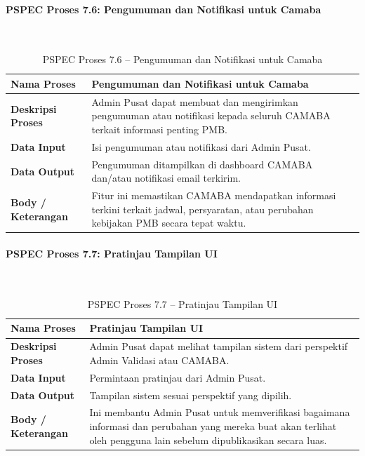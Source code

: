 \paragraph{PSPEC Proses 7.6: Pengumuman dan Notifikasi untuk Camaba}~\\
\begin{longtable}{|p{}|p{}|}
	\caption{PSPEC Proses 7.6 -- Pengumuman dan Notifikasi untuk Camaba}
	\label{table:3.pspec76}\\
	\hline
	\textbf{Nama Proses} & Pengumuman dan Notifikasi untuk Camaba \\
	\hline
	\textbf{Deskripsi Proses} & Admin Pusat dapat membuat dan mengirimkan pengumuman atau notifikasi kepada seluruh CAMABA terkait informasi penting PMB. \\
	\hline
	\textbf{Data Input} & Isi pengumuman atau notifikasi dari Admin Pusat. \\
	\hline
	\textbf{Data Output} & Pengumuman ditampilkan di dashboard CAMABA dan/atau notifikasi email terkirim. \\
	\hline
	\textbf{Body / Keterangan} & Fitur ini memastikan CAMABA mendapatkan informasi terkini terkait jadwal, persyaratan, atau perubahan kebijakan PMB secara tepat waktu. \\
	\hline
\end{longtable}

\paragraph{PSPEC Proses 7.7: Pratinjau Tampilan UI}~\\
\begin{longtable}{|p{}|p{}|}
	\caption{PSPEC Proses 7.7 -- Pratinjau Tampilan UI}
	\label{table:3.pspec77}\\
	\hline
	\textbf{Nama Proses} & Pratinjau Tampilan UI \\
	\hline
	\textbf{Deskripsi Proses} & Admin Pusat dapat melihat tampilan sistem dari perspektif Admin Validasi atau CAMABA. \\
	\hline
	\textbf{Data Input} & Permintaan pratinjau dari Admin Pusat. \\
	\hline
	\textbf{Data Output} & Tampilan sistem sesuai perspektif yang dipilih. \\
	\hline
	\textbf{Body / Keterangan} & Ini membantu Admin Pusat untuk memverifikasi bagaimana informasi dan perubahan yang mereka buat akan terlihat oleh pengguna lain sebelum dipublikasikan secara luas. \\
	\hline
\end{longtable}